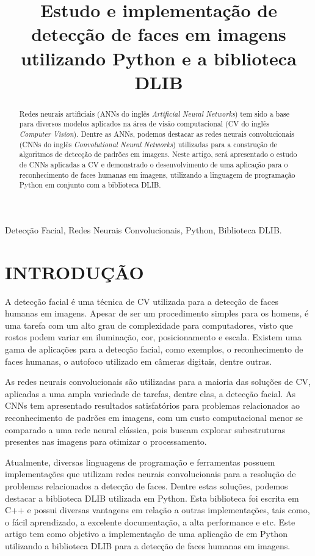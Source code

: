 \documentclass[conference]{IEEEtran}
\title{Estudo e implementação de detecção de faces em imagens utilizando Python e a biblioteca DLIB}
\author{
    \IEEEauthorblockN{José B. M. Trineto \\ Werberson P. da Silva}
    \IEEEauthorblockA{
        \textit{Universidade de Brasília - Departamento de Engenharia Elétrica}
    }
}
\begin{document}
    \maketitle
    \begin{abstract}
        Redes neurais artificiais (ANNs do inglês \textit{Artificial Neural Networks}) tem sido a base para diversos modelos aplicados na área de visão computacional (CV do inglês \textit{Computer Vision}). Dentre as ANNs, podemos destacar as redes neurais convolucionais (CNNs do inglês \textit{Convolutional Neural Networks}) utilizadas para a construção de algoritmos de detecção de padrões em imagens. Neste artigo, será apresentado o estudo de CNNs aplicadas a CV e demonstrado o desenvolvimento de uma aplicação para o reconhecimento de faces humanas em imagens, utilizando a linguagem de programação Python em conjunto com a biblioteca DLIB. 
    \end{abstract}
     \begin{IEEEkeywords}
     	  Detecção Facial, Redes Neurais Convolucionais, Python, Biblioteca DLIB.
	\end{IEEEkeywords}
    \section{INTRODUÇÃO}
		A detecção facial é uma técnica de CV utilizada para a detecção de faces humanas em imagens.	Apesar de ser um procedimento simples para os homens, é uma tarefa com um alto grau de complexidade para computadores, visto que rostos podem variar em iluminação, cor, posicionamento e escala. Existem uma gama de aplicações para a detecção facial, como exemplos, o reconhecimento de faces humanas, o autofoco utilizado em câmeras digitais, dentre outras.
		
	    As redes neurais convolucionais são utilizadas para a maioria das soluções de CV, aplicadas a uma ampla variedade de tarefas, dentre elas, a detecção facial. As CNNs tem apresentado resultados satisfatórios para problemas relacionados ao reconhecimento de padrões em imagens, com um custo computacional menor se comparado a uma rede neural clássica, pois buscam explorar subestruturas presentes nas imagens para otimizar o processamento.
	    
		Atualmente, diversas linguagens de programação e ferramentas possuem implementações que utilizam redes neurais convolucionais para a resolução de problemas relacionados a detecção de faces. Dentre estas soluções, podemos destacar a biblioteca DLIB utilizada em Python. Esta biblioteca foi escrita em C++ e possui diversas vantagens em relação a outras implementações, tais como, o fácil aprendizado, a excelente documentação, a alta performance e etc. Este artigo tem como objetivo a implementação de uma aplicação de em Python utilizando a biblioteca DLIB para a detecção de faces humanas em imagens.
		
\end{document}

